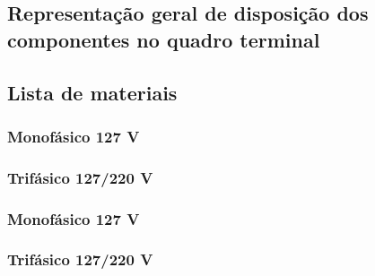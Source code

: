 \subsection{Representação geral de disposição dos componentes no quadro terminal}

\subsection{Lista de materiais}
\subsubsection{Monofásico 127 V}
\subsubsection{Trifásico 127/220 V}
\subsubsection{Monofásico 127 V}
\subsubsection{Trifásico 127/220 V}